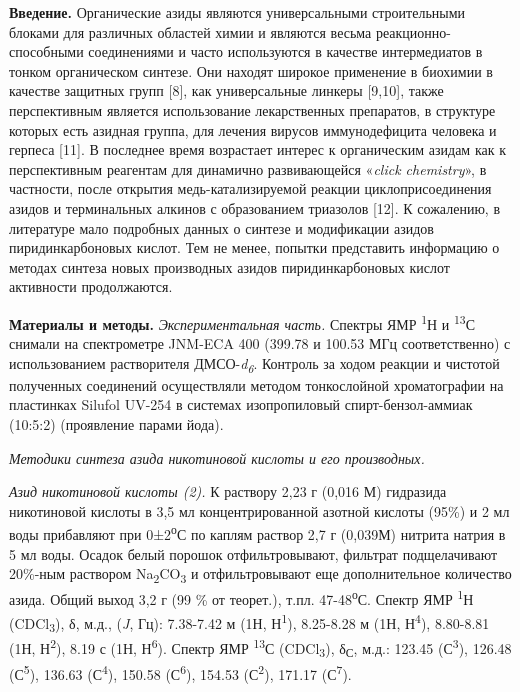 \begin{multicols}{2}
{\bfseries Введение.} Органические азиды являются универсальными
строительными блоками для различных областей химии и являются весьма
реакционно-способными соединениями и часто используются в качестве
интермедиатов в тонком органическом синтезе. Они находят широкое
применение в биохимии в качестве защитных групп {[}8{]}, как
универсальные линкеры {[}9,10{]}, также перспективным является
использование лекарственных препаратов, в структуре которых есть азидная
группа, для лечения вирусов иммунодефицита человека и герпеса {[}11{]}.
В последнее время возрастает интерес к органическим азидам как к
перспективным реагентам для динамично развивающейся «\emph{click
chemistry}», в частности, после открытия медь-катализируемой реакции
циклоприсоединения азидов и терминальных алкинов с образованием
триазолов {[}12{]}. К сожалению, в литературе мало подробных данных о
синтезе и модификации азидов пиридинкарбоновых кислот. Тем не менее,
попытки представить информацию о методах синтеза новых производных
азидов пиридинкарбоновых кислот активности продолжаются.

{\bfseries Материалы и методы.} \emph{Экспериментальная часть.} Спектры ЯМР
\textsuperscript{1}Н и \textsuperscript{13}С снимали на спектрометре
JNM-ECA 400 (399.78 и 100.53 МГц соответственно) с использованием
растворителя ДМСО-\emph{d\textsubscript{6}}. Контроль за ходом реакции и
чистотой полученных соединений осуществляли методом тонкослойной
хроматографии на пластинках Silufol UV-254 в системах изопропиловый
спирт-бензол-аммиак (10:5:2) (проявление парами йода).

\emph{Методики синтеза азида никотиновой кислоты и его производных.}

\emph{Азид никотиновой кислоты (2).} К раствору 2,23 г (0,016 М)
гидразида никотиновой кислоты в 3,5 мл концентрированной азотной кислоты
(95\%) и 2 мл воды прибавляют при 0±2\textsuperscript{о}С по каплям
раствор 2,7 г (0,039М) нитрита натрия в 5 мл воды. Осадок белый порошок
отфильтровывают, фильтрат подщелачивают 20\%-ным раствором
Na\textsubscript{2}CO\textsubscript{3} и отфильтровывают еще
дополнительное количество азида. Общий выход 3,2 г (99 \% от теорет.),
т.пл. 47-48\textsuperscript{о}С. Спектр ЯМР \textsuperscript{1}Н
(CDCl\textsubscript{3}), δ, м.д., (\emph{J}, Гц): 7.38-7.42 м (1Н,
Н\textsuperscript{1}), 8.25-8.28 м (1Н, Н\textsuperscript{4}), 8.80-8.81
(1Н, Н\textsuperscript{2}), 8.19 с (1Н, Н\textsuperscript{6}). Спектр
ЯМР \textsuperscript{13}С (CDCl\textsubscript{3}), δ\textsubscript{С},
м.д.: 123.45 (С\textsuperscript{3}), 126.48 (С\textsuperscript{5}),
136.63 (С\textsuperscript{4}), 150.58 (С\textsuperscript{6}), 154.53
(С\textsuperscript{2}), 171.17 (С\textsuperscript{7}).


\end{multicols}
